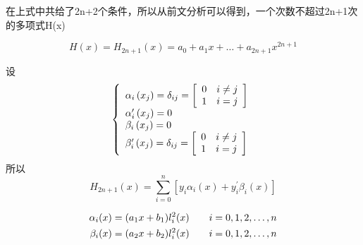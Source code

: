 \documentclass[12pt]{report}
\numberwithin{equation}{section}
\begin{document}
	在上式中共给了2n+2个条件，所以从前文分析可以得到，一个次数不超过2n+1次的多项式H(x)

	$$
	H(x) = H_{2n+1}(x) = a_0 + a_1 x + \ldots + a_{2n+1} x^{2n+1}
	$$

	设
	\begin{equation}
		\notag
		\left\{\begin{array}{l}
		\alpha_{i}\left(x_{j}\right)=\delta_{i j}=\left[\begin{array}{ll}
		0 & i \neq j \\
		1 & i=j
		\end{array}\right] \\
		\alpha_{i}^{\prime}\left(x_{j}\right)=0 \\
		\beta_{i}\left(x_{j}\right)=0 \\
		\beta_{i}^{\prime}\left(x_{j}\right)=\delta_{i j}=\left[\begin{array}{ll}
		0 & i \neq j \\
		1 & i=j
		\end{array}\right] \\
		\end{array}\right.
	\end{equation}
	所以
	$$
	H_{2 n+1}(x)=\sum_{i=0}^{n}\left[y_{i} \alpha_{i}(x)+y_{i}^{\prime} \beta_{i}(x)\right]
	$$

	\begin{equation}
		\begin{aligned}
			\notag
			\alpha_i(x) = (a_1 x + b_1)l_{i}^2(x) \quad \quad i = 0, 1, 2, \ldots , n  \\
			\beta_i(x) = (a_2 x + b_2)l_{i}^2(x) \quad \quad i = 0, 1, 2, \ldots , n 
		\end{aligned}
	\end{equation}
\end{document}
